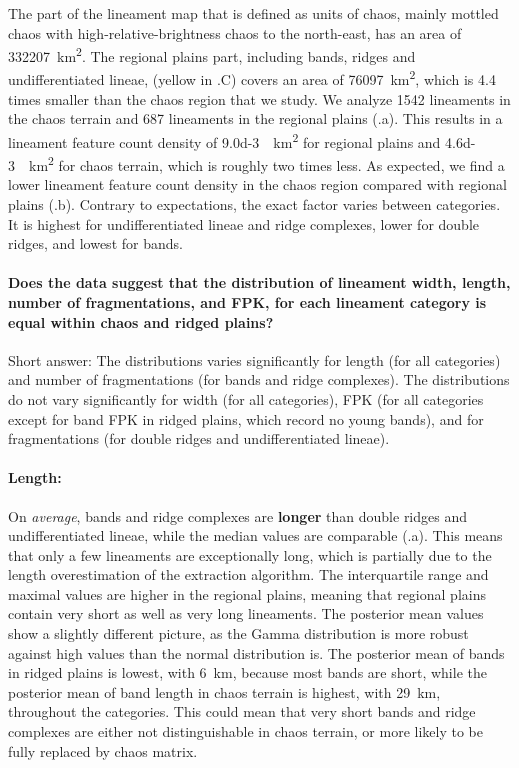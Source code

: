 
The part of the lineament map that is defined as units of chaos, mainly mottled chaos with high-relative-brightness chaos to the north-east, has an area of \qty{332207}{\km^2}. The regional plains part, including bands, ridges and undifferentiated lineae, (yellow in .C) covers an area of \qty{76097}{\km^2}, which is 4.4 times smaller than the chaos region that we study. 
We analyze 1542 lineaments in the chaos terrain and 687 lineaments in the regional plains (.a). This results in a lineament feature count density of \qty{9.0d-3}{\per\km^2} for regional plains and \qty{4.6d-3}{\per\km^2} for chaos terrain, which is roughly two times less. As expected, we find a lower lineament feature count density in the chaos region compared with regional plains (.b). Contrary to expectations, the exact factor varies between categories. It is highest for undifferentiated lineae and ridge complexes, lower for double ridges, and lowest for bands. 

\paragraph{\textbf{Does the data suggest that the distribution of lineament width, length, number of fragmentations, and FPK, for each lineament category is equal within chaos and ridged plains?}}\label{sec:Q2_width_length_FPK}
Short answer: The distributions varies significantly for length (for all categories) and number of fragmentations (for bands and ridge complexes). The distributions do not vary significantly for width (for all categories), FPK (for all categories except for band FPK in ridged plains, which record no young bands), and for fragmentations (for double ridges and undifferentiated lineae).

\paragraph{Length:} On \textit{average}, bands and ridge complexes are \textbf{longer} than double ridges and undifferentiated lineae, while the median values are comparable (.a). This means that only a few lineaments are exceptionally long, which is partially due to the length overestimation of the extraction algorithm. The interquartile range and maximal values are higher in the regional plains, meaning that regional plains contain very short as well as very long lineaments. The posterior mean values show a slightly different picture, as the Gamma distribution is more robust against high values than the normal distribution is. The posterior mean of bands in ridged plains is lowest, with 6~km, because most bands are short, while the posterior mean of band length in chaos terrain is highest, with 29~km, throughout the categories. This could mean that very short bands and ridge complexes are either not distinguishable in chaos terrain, or more likely to be fully replaced by chaos matrix.

